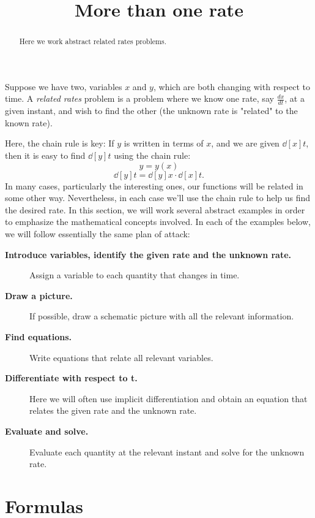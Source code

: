 \documentclass{ximera}
\title[Dig-In:]{More than one rate}
\begin{document}
\begin{abstract}
  Here we work abstract related rates problems.
\end{abstract}
\maketitle


Suppose we have two, variables $x$ and $y$, which are both changing with
respect to time.  A \textit{related rates} problem is a problem where
we know one rate, say $\frac{dx}{dt}$, at a given instant, and wish to find the other (the unknown rate is "related" to the known rate).

Here, the chain rule is key: If $y$ is written in terms of $x$, and we
are given $\dd[x]{t}$, then it is easy to find $\dd[y]{t}$ using the
chain rule:
\[
y=y(x)
\]
\[
\dd[y]{t}=\dd[y]{x}\cdot \dd[x]{t}.
\]
In many cases, particularly the interesting ones, our functions will
be related in some other way. Nevertheless, in each case we'll use the
 chain rule to help us find the desired rate. In this
section, we will work several abstract examples in order to emphasize
the mathematical concepts involved. In each of the examples below, we
will follow essentially the same plan of attack:



\begin{description}
\item[\textbf{Introduce variables, identify the given rate and the unknown rate.}]
               
               Assign a variable to each quantity that changes in time.
\item[\textbf{Draw a picture.}] If possible, draw a schematic picture with all the relevant information. 
\item[\textbf{Find equations.}] Write equations that relate all
  relevant variables.
\item[\textbf{Differentiate with respect to t.}] Here we will often use
  implicit differentiation and obtain an equation that relates the given rate and the unknown rate. 
\item[\textbf{Evaluate and solve.}] Evaluate
each quantity at the relevant instant and solve for the unknown rate.

\end{description}




\section{Formulas}
\end{document}
